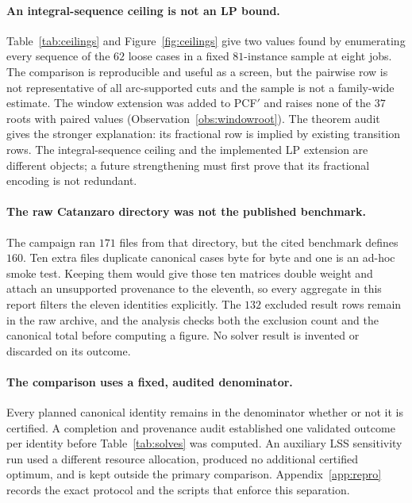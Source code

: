 \paragraph{An integral-sequence ceiling is not an LP bound.}
Table~\ref{tab:ceilings} and Figure~\ref{fig:ceilings} give two values found by
enumerating every sequence of the $62$ loose cases in a fixed $81$-instance sample at
eight jobs. The comparison is reproducible and useful as a screen, but the pairwise row
is not representative of all arc-supported cuts and the sample is not a family-wide
estimate.
The window extension was added to PCF$'$ and raises none of the $37$ roots with paired
values (Observation~\ref{obs:windowroot}). The theorem audit gives the stronger
explanation: its fractional row is implied by existing transition rows. The
integral-sequence ceiling and the implemented LP extension are different objects; a
future strengthening must first prove that its fractional encoding is not redundant.

\paragraph{The raw Catanzaro directory was not the published benchmark.}
The campaign ran $171$ files from that directory, but the cited benchmark defines
$160$. Ten extra files duplicate canonical cases byte for byte and one is an ad-hoc
smoke test. Keeping them would give those ten matrices double weight and attach an
unsupported provenance to the eleventh, so every aggregate in this report filters the
eleven identities explicitly. The $132$ excluded result rows remain in the raw archive,
and the analysis checks both the exclusion count and the canonical total before
computing a figure. No solver result is invented or discarded on its outcome.

\paragraph{The comparison uses a fixed, audited denominator.}
Every planned canonical identity remains in the denominator whether or not it is
certified. A completion and provenance audit established one validated outcome per
identity before Table~\ref{tab:solves} was computed. An auxiliary LSS sensitivity run
used a different resource allocation, produced no additional certified optimum, and is
kept outside the primary comparison. Appendix~\ref{app:repro} records the exact protocol
and the scripts that enforce this separation.

